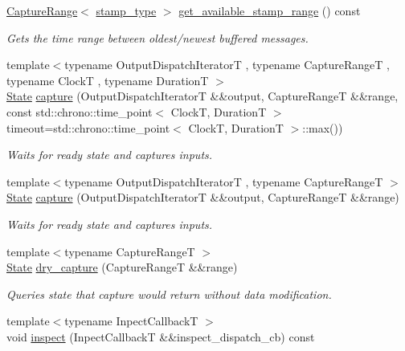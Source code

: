 \begin{DoxyCompactItemize}
\hyperlink{structflow_1_1_capture_range}{Capture\+Range}$<$ \hyperlink{classflow_1_1_captor_interface_a2b87d20d17e8d1437941bd98fe514bc8}{stamp\+\_\+type} $>$ \hyperlink{classflow_1_1_captor_interface_aaa637f69db2258f19c516d7e42c94bb4}{get\+\_\+available\+\_\+stamp\+\_\+range} () const
\begin{DoxyCompactList}\small\item\em Gets the time range between oldest/newest buffered messages. \end{DoxyCompactList}\item 
{\footnotesize template$<$typename Output\+Dispatch\+IteratorT , typename Capture\+RangeT , typename ClockT , typename DurationT $>$ }\\\hyperlink{namespaceflow_adefe9726e597eb50c46f0f6a202018e9}{State} \hyperlink{classflow_1_1_captor_interface_ae95095d924214605bfeac70d0bd5ad35}{capture} (Output\+Dispatch\+IteratorT \&\&output, Capture\+RangeT \&\&range, const std\+::chrono\+::time\+\_\+point$<$ ClockT, DurationT $>$ timeout=std\+::chrono\+::time\+\_\+point$<$ ClockT, DurationT $>$\+::max())
\begin{DoxyCompactList}\small\item\em Waits for ready state and captures inputs. \end{DoxyCompactList}\item 
{\footnotesize template$<$typename Output\+Dispatch\+IteratorT , typename Capture\+RangeT $>$ }\\\hyperlink{namespaceflow_adefe9726e597eb50c46f0f6a202018e9}{State} \hyperlink{classflow_1_1_captor_interface_ab645172a3401cc978fd4618a64a83e3d}{capture} (Output\+Dispatch\+IteratorT \&\&output, Capture\+RangeT \&\&range)
\begin{DoxyCompactList}\small\item\em Waits for ready state and captures inputs. \end{DoxyCompactList}\item 
{\footnotesize template$<$typename Capture\+RangeT $>$ }\\\hyperlink{namespaceflow_adefe9726e597eb50c46f0f6a202018e9}{State} \hyperlink{classflow_1_1_captor_interface_a2cd64d7a401f7ee1bfd63ddea2c49f4a}{dry\+\_\+capture} (Capture\+RangeT \&\&range)
\begin{DoxyCompactList}\small\item\em Queries state that {\ttfamily capture} would return without data modification. \end{DoxyCompactList}\item 
{\footnotesize template$<$typename Inpect\+CallbackT $>$ }\\void \hyperlink{classflow_1_1_captor_interface_a4648d1a3ec30a603e24e9ba0a667159d}{inspect} (Inpect\+CallbackT \&\&inspect\+\_\+dispatch\+\_\+cb) const

\end{DoxyCompactItemize}
